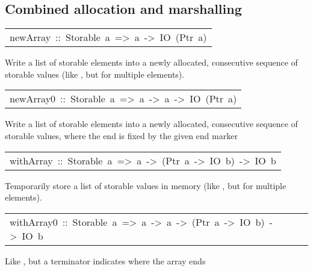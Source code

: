 \subsection{Combined allocation and marshalling
}
\begin{haddockdesc}
\item[\begin{tabular}{@{}l}
newArray\ ::\ Storable\ a\ =>\ {\char 91}a{\char 93}\ ->\ IO\ (Ptr\ a)
\end{tabular}]\haddockbegindoc
Write a list of storable elements into a newly allocated, consecutive
 sequence of storable values
 (like , but for multiple elements).
\par

\end{haddockdesc}
\begin{haddockdesc}
\item[\begin{tabular}{@{}l}
newArray0\ ::\ Storable\ a\ =>\ a\ ->\ {\char 91}a{\char 93}\ ->\ IO\ (Ptr\ a)
\end{tabular}]\haddockbegindoc
Write a list of storable elements into a newly allocated, consecutive
 sequence of storable values, where the end is fixed by the given end marker
\par

\end{haddockdesc}
\begin{haddockdesc}
\item[\begin{tabular}{@{}l}
withArray\ ::\ Storable\ a\ =>\ {\char 91}a{\char 93}\ ->\ (Ptr\ a\ ->\ IO\ b)\ ->\ IO\ b
\end{tabular}]\haddockbegindoc
Temporarily store a list of storable values in memory
 (like , but for multiple elements).
\par

\end{haddockdesc}
\begin{haddockdesc}
\item[\begin{tabular}{@{}l}
withArray0\ ::\ Storable\ a\ =>\ a\ ->\ {\char 91}a{\char 93}\ ->\ (Ptr\ a\ ->\ IO\ b)\ ->\ IO\ b
\end{tabular}]\haddockbegindoc
Like , but a terminator indicates where the array ends
\par

\end{haddockdesc}

